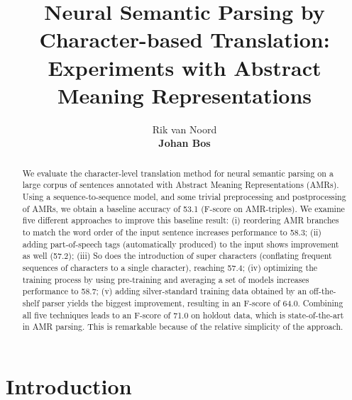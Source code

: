 \documentclass[a4paper,10pt,twoside]{article}
\begin{document}
\title{Neural Semantic Parsing by Character-based Translation: Experiments with Abstract Meaning Representations}

\author{Rik van Noord \\
{\normalsize \bf Johan Bos} \\
\AND {}} 

\newcommand{\notered}[1]{\todo[color=red!30,line,size=\tiny]{#1}}

\maketitle\thispagestyle{empty} 



\begin{abstract}
We evaluate the character-level translation method for neural semantic parsing on a large corpus of sentences annotated with Abstract Meaning Representations (AMRs). Using a sequence-to-sequence model, and some trivial preprocessing and postprocessing of AMRs, we obtain a baseline accuracy of 53.1 (F-score on AMR-triples). We examine five different approaches to improve this baseline result: (i) reordering AMR branches to match the word order of the input sentence increases performance to 58.3; (ii) adding part-of-speech tags (automatically produced) to the input shows improvement as well (57.2); (iii) So does the introduction of super characters (conflating frequent sequences of characters to a single character), reaching 57.4; (iv) optimizing the training process by using pre-training and averaging a set of models increases performance to 58.7; (v) adding silver-standard training data obtained by an off-the-shelf parser yields the biggest improvement, resulting in an F-score of 64.0. Combining all five techniques leads to an F-score of 71.0 on holdout data, which is state-of-the-art in AMR parsing. This is remarkable because of the relative simplicity of the approach.
\end{abstract}

\section{Introduction}
\end{document}

